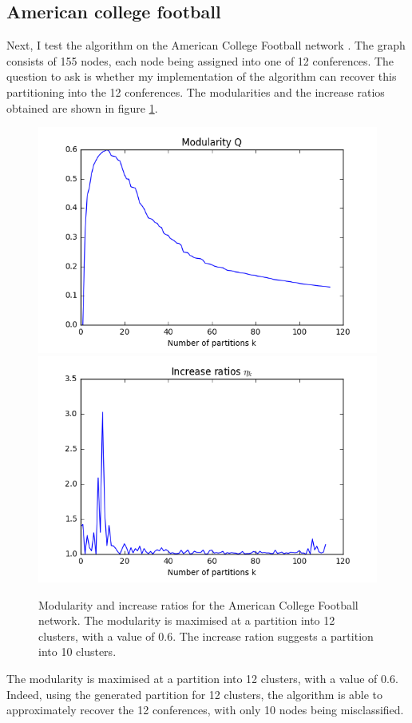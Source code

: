 \documentclass[12pt]{article}
\theoremstyle{definition}
\begin{document}
\subsection{American college football \cite{girvan2002community}}
Next, I test the algorithm on the American College Football network \cite{girvan2002community}. The graph consists of 155 nodes, each node being assigned into one of 12 conferences. The question to ask is whether my implementation of the algorithm can recover this partitioning into the 12 conferences. The modularities and the increase ratios obtained are shown in figure \ref{fig_football_eval}.
\begin{figure}
	\includegraphics[scale=0.44]{football_graph_Q}
	\includegraphics[scale=0.44]{football_graph_eta}
	\centering
	\caption{Modularity and increase ratios for the American College Football network. The modularity is maximised at a partition into 12 clusters, with a value of 0.6. The increase ration suggests a partition into 10 clusters.}
	\label{fig_football_eval}
\end{figure}
The modularity is maximised at a partition into 12 clusters, with a value of 0.6. Indeed, using the generated partition for 12 clusters, the algorithm is able to approximately recover the 12 conferences, with only 10 nodes being misclassified. 



\end{document}
